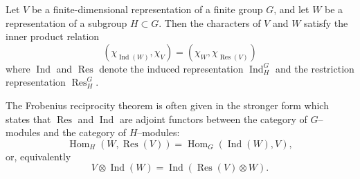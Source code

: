 \documentclass{article}
\newcommand{\Ind}{\operatorname{Ind}}
\newcommand{\Res}{\operatorname{Res}}
\newcommand{\Hom}{\operatorname{Hom}}
\begin{document}
Let $V$ be a finite-dimensional representation of a finite group $G$, and let $W$ be a representation of a subgroup $H \subset G$. Then the characters of $V$ and $W$ satisfy the inner product relation
$$
(\chi_{\Ind(W)}, \chi_V) = (\chi_W, \chi_{\Res(V)})
$$
where $\Ind$ and $\Res$ denote the induced representation $\Ind_H^G$ and the restriction representation $\Res_H^G$.

The Frobenius reciprocity theorem is often given in the stronger form which states  that $\Res$ and $\Ind$ are adjoint functors between the category of $G$--modules and the category of $H$--modules:
$$
\Hom_H(W, \Res(V)) = \Hom_G(\Ind(W),V),
$$
or, equivalently
$$
V \otimes \Ind(W) = \Ind(\Res(V) \otimes W).
$$
\end{document}
